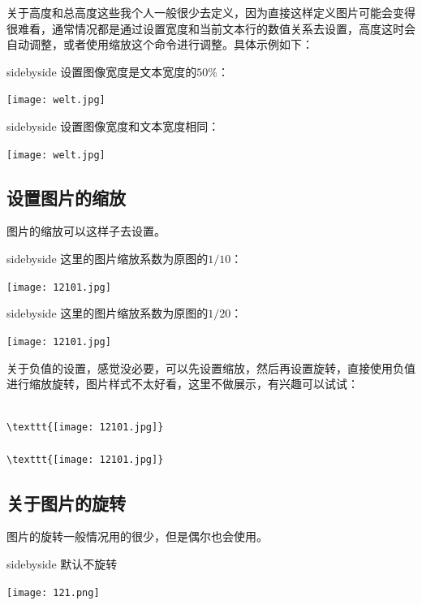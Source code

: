 \documentclass[cn,chinese,color=cyan]{elegantbook}
\begin{document}
关于高度和总高度这些我个人一般很少去定义，因为直接这样定义图片可能会变得很难看，通常情况都是通过设置宽度和当前文本行的数值关系去设置，高度这时会自动调整，或者使用缩放这个命令进行调整。具体示例如下：
\begin{tcblisting}{sidebyside}
设置图像宽度是文本宽度的$50\%$：

\texttt{[image: welt.jpg]}
\end{tcblisting}
\begin{tcblisting}{sidebyside}
设置图像宽度和文本宽度相同：

\texttt{[image: welt.jpg]}
\end{tcblisting}
\subsection{设置图片的缩放}
图片的缩放可以这样子去设置。
\begin{tcblisting}{sidebyside}
这里的图片缩放系数为原图的$1/10$：

\texttt{[image: 12101.jpg]}
\end{tcblisting}

\begin{tcblisting}{sidebyside}
这里的图片缩放系数为原图的$1/20$：

\texttt{[image: 12101.jpg]}
\end{tcblisting}

\begin{note}
关于负值的设置，感觉没必要，可以先设置缩放，然后再设置旋转，直接使用负值进行缩放旋转，图片样式不太好看，这里不做展示，有兴趣可以试试：
\end{note}
\begin{lstlisting}[style=R]

\texttt{[image: 12101.jpg]}

\texttt{[image: 12101.jpg]}
\end{lstlisting}
\subsection{关于图片的旋转}
图片的旋转一般情况用的很少，但是偶尔也会使用。
\begin{tcblisting}{sidebyside}
默认不旋转

\texttt{[image: 121.png]}
\end{tcblisting}
\end{document}

